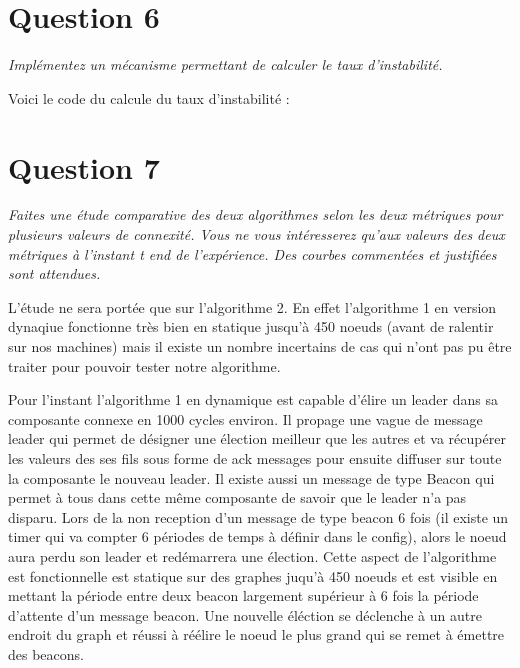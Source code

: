 \documentclass[11pt,a4paper,sans]{report}
\begin{document}
	\section{Question 6}
	\textit{Implémentez un mécanisme permettant de calculer le taux d’instabilité.}

	\par Voici le code du calcule du taux d'instabilité :


	\section{Question 7}
	\textit{Faites une étude comparative des deux algorithmes selon les deux métriques pour plusieurs valeurs de connexité. Vous ne vous intéresserez qu’aux valeurs des deux métriques à l’instant t end de l’expérience. Des courbes commentées et justifiées sont attendues.}

	\par L'étude ne sera portée que sur l'algorithme 2. En effet l'algorithme 1 en version dynaqiue fonctionne très bien en statique jusqu'à 450 noeuds (avant de ralentir sur nos machines) mais il existe un nombre incertains de cas qui n'ont pas pu être traiter pour pouvoir tester notre algorithme.

	\par Pour l'instant l'algorithme 1 en dynamique est capable d'élire un leader dans sa composante connexe en 1000 cycles environ. Il propage une vague de message leader qui permet de désigner une élection meilleur que les autres et va récupérer les valeurs des ses fils sous forme de ack messages pour ensuite diffuser sur toute la composante le nouveau leader. Il existe aussi un message de type Beacon qui permet à tous dans cette même composante de savoir que le leader n'a pas disparu. Lors de la non reception d'un message de type beacon 6 fois  (il existe un timer qui va compter 6 périodes de temps à définir dans le config), alors le noeud aura perdu son leader et redémarrera une élection. Cette aspect de l'algorithme est fonctionnelle est statique sur des graphes juqu'à 450 noeuds et est visible en mettant la période entre deux beacon largement supérieur à 6 fois la période d'attente d'un message beacon. Une nouvelle éléction se déclenche à un autre endroit du graph et réussi à réélire le noeud le plus grand qui se remet à émettre des beacons.
\end{document}
